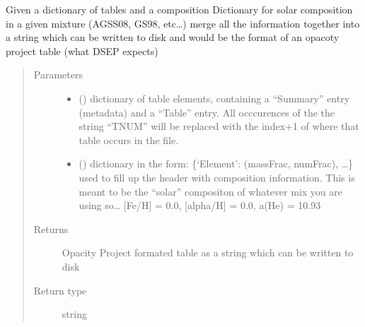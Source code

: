 \documentclass[letterpaper,10pt,english]{sphinxmanual}
\begin{document}
\begin{fulllineitems}
\label{\detokenize{pyTOPSScrape.api:pyTOPSScrape.api.convert.format_OPAL_table}}
\sphinxAtStartPar
Given a dictionary of tables and a composition Dictionary for solar
composition in a given mixture (AGSS08, GS98, etc…) merge all the
information together into a string which can be written to disk and
would be the format of an opacoty project table (what DSEP expects)
\begin{quote}\begin{description}
\item[{Parameters}] \leavevmode\begin{itemize}
\item {} 
\sphinxAtStartPar
{} () \textendash{} dictionary of table elements, containing a “Summary” entry
(metadata) and a “Table” entry. All occcurences of the the string
“TNUM” will be replaced with the index+1 of where that table occurs
in the file.

\item {} 
\sphinxAtStartPar
{} () \textendash{} dictionary in the form: \{‘Element’: (massFrac, numFrac), …\} used
to fill up the header with composition information. This is meant
to be the “solar” compositon of whatever mix you are using so…
{[}Fe/H{]} = 0.0, {[}alpha/H{]} = 0.0, a(He) = 10.93

\end{itemize}

\item[{Returns}] \leavevmode
\sphinxAtStartPar
{} \textendash{} Opacity Project formated table as a string which can be written to
disk

\item[{Return type}] \leavevmode
\sphinxAtStartPar
string

\end{description}\end{quote}

\end{fulllineitems}

\end{document}
